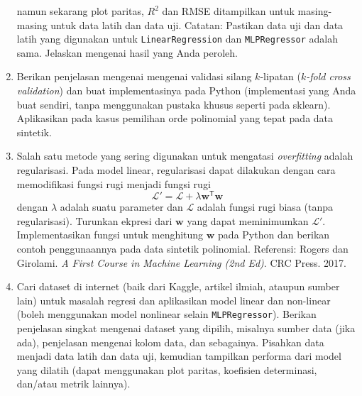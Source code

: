 \documentclass[a4paper,11pt]{article} %
\newcommand{\pyinline}[1]{\texttt{#1}}
\begin{document}
\begin{enumerate}
namun sekarang plot paritas, $R^{2}$ dan RMSE ditampilkan untuk
masing-masing untuk data latih dan data uji.
Catatan: Pastikan data uji dan data latih yang digunakan
untuk \pyinline{LinearRegression} dan \pyinline{MLPRegressor} adalah sama.
Jelaskan mengenai hasil yang Anda peroleh.
%
%
\item Berikan penjelasan mengenai mengenai validasi silang $k$-lipatan
($k$\textit{-fold cross validation})
dan buat implementasinya pada Python (implementasi yang Anda buat sendiri,
tanpa menggunakan pustaka khusus seperti pada sklearn).
Aplikasikan pada kasus pemilihan orde polinomial yang tepat pada
data sintetik.
%
%
\item Salah satu metode yang sering digunakan untuk mengatasi
\textit{overfitting} adalah regularisasi. Pada model linear, regularisasi
dapat dilakukan dengan cara memodifikasi fungsi rugi menjadi
fungsi rugi
$$
\mathcal{L}' = \mathcal{L} + \lambda \mathbf{w}^{\mathsf{T}}\mathbf{w}
$$
dengan $\lambda$ adalah suatu parameter dan $\mathcal{L}$
adalah fungsi rugi biasa (tanpa regularisasi).
Turunkan ekpresi dari $\mathbf{w}$ yang dapat meminimumkan $\mathcal{L}'$.
Implementasikan fungsi untuk menghitung $\mathbf{w}$ pada Python
dan berikan contoh penggunaannya pada data sintetik polinomial.
Referensi: Rogers dan Girolami.
\textit{A First Course in Machine Learning (2nd Ed)}.
CRC Press. 2017.
%
%
\item Cari dataset di internet (baik dari Kaggle, artikel ilmiah,
ataupun sumber lain) untuk masalah regresi dan aplikasikan model linear
dan non-linear (boleh menggunakan
model nonlinear selain \pyinline{MLPRegressor}). Berikan penjelasan singkat
mengenai dataset yang dipilih, misalnya sumber data (jika ada),
penjelasan mengenai kolom data, dan sebagainya.
Pisahkan data menjadi data latih dan data uji, kemudian tampilkan
performa dari model yang dilatih (dapat menggunakan plot paritas, koefisien
determinasi, dan/atau metrik lainnya). 
\end{enumerate}
\end{document}
